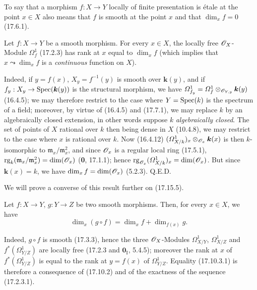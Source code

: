 To say that a morphism $f:X\to Y$ locally of finite presentation is étale at the point $x\in X$ also means that $f$ is smooth at the point $x$ and that $\dim_x f=0$ (17.6.1).

\begin{proposition}[17.10.2]
\label{IV.17.10.2}
Let $f:X\to Y$ be a smooth morphism. For every $x\in X$, the locally free $\mathscr{O}_X$-Module $\varOmega_f^1$ \textup{(17.2.3)} has rank at $x$ equal to $\dim_x f$ \textup{(which implies that $x\leadsto\dim_x f$ is a \emph{continuous} function on $X$)}.
\end{proposition}

Indeed, if $y=f(x)$, $X_y=f^{-1}(y)$ is smooth over $\boldsymbol{k}(y)$, and if $f_y:X_y\to\operatorname{Spec}(\boldsymbol{k}(y))$ is the structural morphism, we have $\varOmega_{f_y}^1=\varOmega_f^1\otimes_{\mathscr{O}_{Y,y}}\boldsymbol{k}(y)$ (16.4.5); we may therefore restrict to the case where $Y=\operatorname{Spec}(k)$ is the spectrum of a field; moreover, by virtue of (16.4.5) and (17.7.1), we may replace $k$ by an algebraically closed extension, in other words
suppose $k$ \emph{algebraically closed}. The set of points of $X$ rational over $k$ then being dense in $X$ (10.4.8), we may restrict to the case where $x$ is rational over $k$. Now (16.4.12) $(\varOmega^1_{X/k})_x\otimes_{\mathscr{O}_x}\boldsymbol{k}(x)$ is then $k$-isomorphic to $\mathfrak m_x/\mathfrak m_x^2$, and since $\mathscr{O}_x$ is a regular local ring (17.5.1), $\operatorname{rg}_k(\mathfrak m_x/\mathfrak m_x^2)=\dim(\mathscr{O}_x)$ (\textbf{0}, 17.1.1); hence $\operatorname{rg}_{\mathscr{O}_x}(\varOmega^1_{X/k})_x=\dim(\mathscr{O}_x)$. But since $\boldsymbol{k}(x)=k$, we have $\dim_x f=\dim(\mathscr{O}_x)$ (5.2.3). Q.E.D.

We will prove a converse of this result further on (17.15.5).

\begin{corollary}[17.10.3]
\label{IV.17.10.3}
Let $f:X\to Y$, $g:Y\to Z$ be two smooth morphisms. Then, for every $x\in X$, we have
\begin{equation}
\label{IV.17.10.3.1}
\tag{17.10.3.1}
\dim_x(g\circ f)=\dim_x f+\dim_{f(x)}g.
\end{equation}
\end{corollary}

Indeed, $g\circ f$ is smooth (17.3.3), hence the three $\mathscr{O}_X$-Modules $\varOmega^1_{X/Y}$, $\varOmega^1_{X/Z}$ and $f^*(\varOmega^1_{Y/Z})$ are locally free (17.2.3 and $\mathbf{0}_{\mathrm I}$, 5.4.5); moreover the rank at $x$ of $f^*(\varOmega^1_{Y/Z})$ is equal to the rank at $y=f(x)$ of $\varOmega^1_{Y/Z}$. Equality (17.10.3.1) is therefore a consequence of (17.10.2) and of the exactness of the sequence (17.2.3.1).


